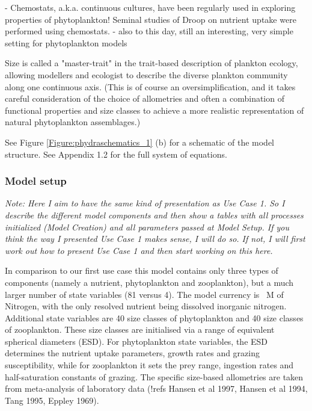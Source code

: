 \documentclass[journal abbreviations, manuscript]{copernicus}
\begin{document}
- Chemostats, a.k.a. continuous cultures, have been regularly used in exploring properties of phytoplankton! Seminal studies of Droop on nutrient uptake were performed using chemostats. \citep{Droop1968VitaminLutheri} 
- also to this day, still an interesting, very simple setting for phytoplankton models

Size is called a "master-trait" in the trait-based description of plankton ecology, allowing modellers and ecologist to describe the diverse plankton community along one continuous axis. (This is of course an oversimplification, and it takes careful consideration of the choice of allometries and often a combination of functional properties and size classes to achieve a more realistic representation of natural phytoplankton assemblages.)

See Figure \ref{Figure:phydraschematics_1} (b) for a schematic of the model structure. See Appendix 1.2 for the full system of equations.

\subsubsection{Model setup}
\textit{Note: Here I aim to have the same kind of presentation as Use Case 1. So I describe the different model components and then show a tables with all processes initialized (Model Creation) and all parameters passed at Model Setup. If you think the way I presented Use Case 1 makes sense, I will do so. If not, I will first work out how to present Use Case 1 and then start working on this here.}



In comparison to our first use case this model contains only three types of components (namely a nutrient, phytoplankton and zooplankton), but a much larger number of state variables (81 versus 4). The model currency is \unit{\mu M} of Nitrogen, with the only resolved nutrient being dissolved inorganic nitrogen. Additional state variables are 40 size classes of phytoplankton and 40 size classes of zooplankton. These size classes are initialised via a range of equivalent spherical diameters (ESD). For phytoplankton state variables, the ESD determines the nutrient uptake parameters, growth rates and grazing susceptibility, while for zooplankton it sets the prey range, ingestion rates and half-saturation constants of grazing. The specific size-based allometries are taken from meta-analysis of laboratory data (!refs Hansen et al 1997, Hansen et al 1994, Tang 1995, Eppley 1969). 
\end{document}
